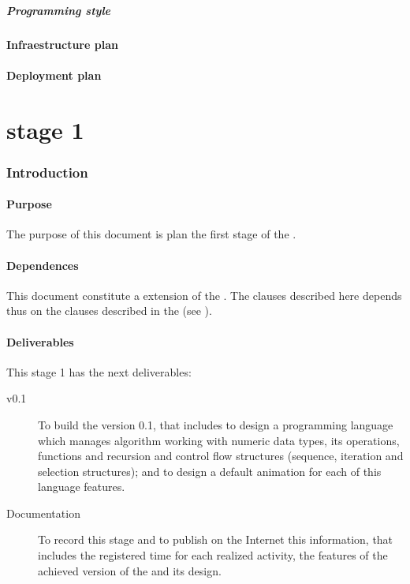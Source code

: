 \documentclass[twocolumn]{article}
\begin{document}
\subsubsection{Programming style}
\subsection{Infraestructure plan}
\subsection{Deployment plan}

\part{\favpl stage 1}
\label{part:st1-plan}

\section{Introduction}

\subsection{Purpose}
The purpose of this document is plan the first stage of the
\favp.

\subsection{Dependences}
This document constitute a extension of the \favpl. The clauses
described here depends thus on the clauses described in the \favpl
(see ).

\subsection{Deliverables}
This stage 1 has the next deliverables:

\begin{description}
\item[\fav v0.1] To build the \fav version 0.1, that includes to design a
  \fav programming language which manages algorithm working with
  numeric data types, its operations, functions and recursion and
  control flow structures (sequence, iteration and selection
  structures); and to design a default animation for each of this
  language features.
\item[Documentation] To record this stage and to publish on the
  Internet this information, that includes the registered time for
  each realized activity, the features of the achieved version of the
  \fav and its design.
\end{description}
\end{document}
